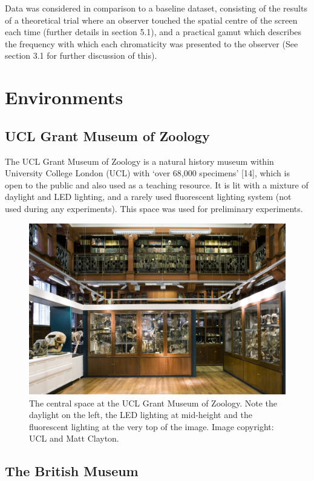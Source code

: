 Data was considered in comparison to a baseline dataset, consisting of the results of a theoretical trial where an observer touched the spatial centre of the screen each time (further details in section 5.1), and a practical gamut which describes the frequency with which each chromaticity was presented to the observer (See section 3.1 for further discussion of this).

\section{Environments}
\subsection{UCL Grant Museum of Zoology}

The UCL Grant Museum of Zoology is a natural history museum within University College London (UCL) with ‘over 68,000 specimens’ [14], which is open to the public and also used as a teaching resource. It is lit with a mixture of daylight and LED lighting, and a rarely used fluorescent lighting system (not used during any experiments).
This space was used for preliminary experiments. 

\begin{figure}[hbp]
\includegraphics[width=\textwidth]{figs/tablet/grant.jpg} 
\caption{The central space at the UCL Grant Museum of Zoology. Note the daylight on the left, the LED lighting at mid-height and the fluorescent lighting at the very top of the image. Image copyright: UCL and Matt Clayton.}
\label{fig:grant}
\end{figure}

\subsection{The British Museum}

